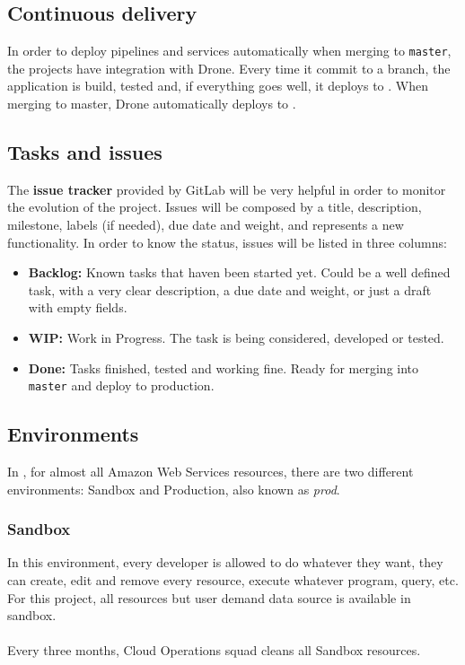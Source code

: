 \subsection{Continuous delivery}

In order to deploy pipelines and services automatically when merging to \texttt{master}, the projects have integration with Drone\cite{drone}. Every time it commit to a branch, the application is build, tested and, if everything goes well, it deploys to . When merging to master, Drone automatically deploys to .

\subsection{Tasks and issues}

The \textbf{issue tracker} provided by GitLab\cite{gitlab} will be very helpful in order to monitor the evolution of the project. Issues will be composed by a title, description, milestone, labels (if needed), due date and weight, and represents a new functionality. In order to know the status, issues will be listed in three columns:

\begin{itemize}
    \item \textbf{Backlog:} Known tasks that haven been started yet. Could be a well defined task, with a very clear description, a due date and weight, or just a draft with empty fields.
    \item \textbf{WIP:} Work in Progress. The task is being considered, developed or tested.
    \item \textbf{Done:} Tasks finished, tested and working fine. Ready for merging into \texttt{master} and deploy to production.
\end{itemize}

\subsection{Environments}

In \company, for almost all Amazon Web Services resources, there are two different environments: Sandbox and Production, also known as \textit{prod}.

\subsubsection*{Sandbox} \label{sandbox}

In this environment, every developer is allowed to do whatever they want, they can create, edit and remove every resource, execute whatever program, query, etc. For this project, all resources but user demand data source is available in sandbox.
\\\\
Every three months, Cloud Operations squad cleans all Sandbox resources.

